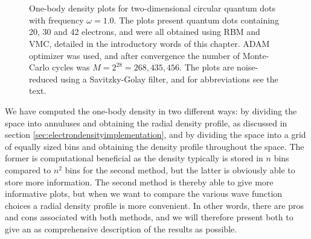 \begin{figure}
	\centering
	\captionsetup[subfigure]{labelformat=empty}
	\hspace{0.1cm}
	\hspace{-0.0cm}
	\\
	
	\hspace{0.1cm}
	\hspace{-0.0cm}
	\\
	
	\hspace{0.1cm}
	\hspace{-0.0cm}
	
	\caption{One-body density plots for two-dimensional circular quantum dots with frequency $\omega=1.0$. The plots present quantum dots containing 20, 30 and 42 electrons, and were all obtained using RBM and VMC, detailed in the introductory words of this chapter. ADAM optimizer was used, and after convergence the number of Monte-Carlo cycles was $M=2^{28}=268,435,456$. The plots are noise-reduced using a Savitzky-Golay filter, and for abbreviations see the text.}
	\label{fig:OB_interaction_1p0w2}
\end{figure}

We have computed the one-body density in two different ways: by dividing the space into annuluses and obtaining the radial density profile, as discussed in section \ref{sec:electrondensityimplementation}, and by dividing the space into a grid of equally sized bins and obtaining the density profile throughout the space. The former is computational beneficial as the density typically is stored in $n$ bins compared to $n^2$ bins for the second method, but the latter is obviously able to store more information. The second method is thereby able to give more informative plots, but when we want to compare the various wave function choices a radial density profile is more convenient. In other words, there are pros and cons associated with both methods, and we will therefore present both to give an as comprehensive description of the results as possible. 

